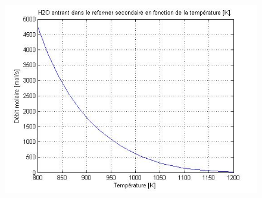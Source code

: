 \begin{figure}[htb!]
	\centering
	\includegraphics[scale=0.70]{media/etude_param/useful/h2o_in2_reformage_secondaire.jpg}
\end{figure}

